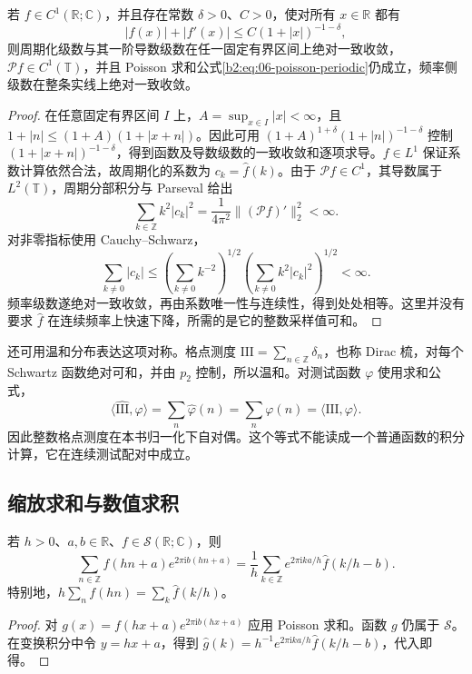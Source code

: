 \begin{proposition}[有限阶衰减条件]\label{b2:prop:06-finite-decay-poisson}
若 \(f\in C^1(\mathbb R;\mathbb C)\)，并且存在常数 \(\delta>0\)、\(C>0\)，使对所有 \(x\in\mathbb R\) 都有
\[
 |f(x)|+|f'(x)|\leq C(1+|x|)^{-1-\delta},
\]
则周期化级数与其一阶导数级数在任一固定有界区间上绝对一致收敛，\(\mathcal Pf\in C^1(\mathbb T)\)，并且 Poisson 求和公式\eqref{b2:eq:06-poisson-periodic}仍成立，频率侧级数在整条实线上绝对一致收敛。
\end{proposition}
\begin{proof}
在任意固定有界区间 \(I\) 上，\(A=\sup_{x\in I}|x|<\infty\)，且 \(1+|n|\leq(1+A)(1+|x+n|)\)。因此可用 \((1+A)^{1+\delta}(1+|n|)^{-1-\delta}\) 控制 \((1+|x+n|)^{-1-\delta}\)，得到函数及导数级数的一致收敛和逐项求导。\(f\in L^1\) 保证系数计算依然合法，故周期化的系数为 \(c_k=\widehat f(k)\)。由于 \(\mathcal Pf\in C^1\)，其导数属于 \(L^2(\mathbb T)\)，周期分部积分与 Parseval 给出
\[
 \sum_{k\in\mathbb Z}k^2|c_k|^2
 =\frac1{4\pi^2}\| (\mathcal Pf)'\|_2^2<\infty.
\]
对非零指标使用 Cauchy--Schwarz，
\[
 \sum_{k\ne0}|c_k|
 \leq\left(\sum_{k\ne0}k^{-2}\right)^{1/2}
       \left(\sum_{k\ne0}k^2|c_k|^2\right)^{1/2}<\infty.
\]
频率级数遂绝对一致收敛，再由系数唯一性与连续性，得到处处相等。这里并没有要求 \(\widehat f\) 在连续频率上快速下降，所需的是它的整数采样值可和。
\end{proof}

还可用温和分布表达这项对称。格点测度 \(\mathrm{III}=\sum_{n\in\mathbb Z}\delta_n\)，也称 Dirac 梳，对每个 Schwartz 函数绝对可和，并由 \(p_2\) 控制，所以温和。对测试函数 \(\varphi\) 使用求和公式，
\[
 \langle\widehat{\mathrm{III}},\varphi\rangle
 =\sum_n\widehat\varphi(n)=\sum_n\varphi(n)
 =\langle\mathrm{III},\varphi\rangle.
\]
因此整数格点测度在本书归一化下自对偶。这个等式不能读成一个普通函数的积分计算，它在连续测试配对中成立。

\subsection{缩放求和与数值求积}
\label{b2:subsec:060104}

\begin{corollary}\label{b2:cor:06-scaled-poisson}
若 \(h>0\)、\(a,b\in\mathbb R\)、\(f\in\mathcal S(\mathbb R;\mathbb C)\)，则
\[
 \sum_{n\in\mathbb Z}f(hn+a)e^{2\pi\mathrm{i}b(hn+a)}
 =\dfrac1h\sum_{k\in\mathbb Z}e^{2\pi\mathrm{i}ka/h}\widehat f(k/h-b).
\]
特别地，\(h\sum_nf(hn)=\sum_k\widehat f(k/h)\)。
\end{corollary}
\begin{proof}
对 \(g(x)=f(hx+a)e^{2\pi\mathrm{i}b(hx+a)}\) 应用 Poisson 求和。函数 \(g\) 仍属于 \(\mathcal S\)。在变换积分中令 \(y=hx+a\)，得到 \(\widehat g(k)=h^{-1}e^{2\pi\mathrm{i}ka/h}\widehat f(k/h-b)\)，代入即得。
\end{proof}

